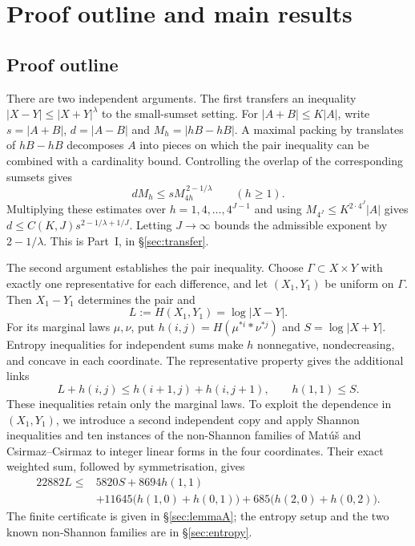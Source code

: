 \documentclass[11pt]{amsart}
\theoremstyle{definition}
\theoremstyle{remark}
\numberwithin{equation}{section}
\begin{document}
\section{Proof outline and main results}\label{sec:outline}

\subsection{Proof outline}
There are two independent arguments. The first transfers an inequality
$|X-Y|\le |X+Y|^\lambda$ to the small-sumset setting. For
$|A+B|\le K|A|$, write $s=|A+B|$, $d=|A-B|$ and $M_h=|hB-hB|$.
A maximal packing by translates of $hB-hB$ decomposes $A$ into pieces
on which the pair inequality can be combined with a cardinality bound.
Controlling the overlap of the corresponding sumsets gives
\begin{equation}\label{eq:onescale}
 dM_h\le sM_{4h}^{\,2-1/\lambda}\qquad(h\ge1).
\end{equation}
Multiplying these estimates over $h=1,4,\ldots,4^{J-1}$ and using
$M_{4^J}\le K^{2\cdot4^J}|A|$ gives
$d\le C(K,J)s^{2-1/\lambda+1/J}$. Letting $J\to\infty$ bounds the
admissible exponent by $2-1/\lambda$. This is Part~I, in
\S\ref{sec:transfer}.

The second argument establishes the pair inequality. Choose
$\Gamma\subset X\times Y$ with exactly one representative for each
difference, and let $(X_1,Y_1)$ be uniform on $\Gamma$. Then
$X_1-Y_1$ determines the pair and
\[
 L:=H(X_1,Y_1)=\log|X-Y|.
\]
For its marginal laws $\mu,\nu$, put
$h(i,j)=H(\mu^{*i}*\nu^{*j})$ and $S=\log|X+Y|$.
Entropy inequalities for independent sums make $h$ nonnegative,
nondecreasing, and concave in each coordinate. The representative
property gives the additional links
\[
 L+h(i,j)\le h(i+1,j)+h(i,j+1),
 \qquad h(1,1)\le S.
\]
These inequalities retain only the marginal laws. To exploit the
dependence in $(X_1,Y_1)$, we introduce a second independent copy and
apply Shannon inequalities and ten instances of the non-Shannon
families of Mat\'u\v{s} and Csirmaz--Csirmaz to integer linear forms
in the four coordinates. Their exact weighted sum, followed by
symmetrisation, gives
\begin{align*}
 22882L\le {}&5820S+8694h(1,1)\\
             &+11645\bigl(h(1,0)+h(0,1)\bigr)
              +685\bigl(h(2,0)+h(0,2)\bigr).
\end{align*}
The finite certificate is given in \S\ref{sec:lemmaA}; the entropy
setup and the two known non-Shannon families are in \S\ref{sec:entropy}.
\end{document}
